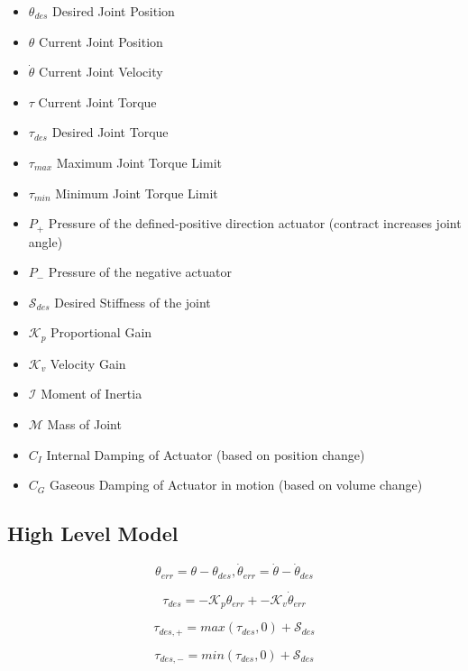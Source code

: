\documentclass[12pt, letterpaper, oneside, notitlepage, onecolumn]{article}
\newcommand{\bbss}[1]{\subsection{#1}}
\begin{document}
\begin{itemize}
\item $\theta_{des}$ Desired Joint Position
\item $\theta$ Current Joint Position
\item $\dot{\theta}$ Current Joint Velocity
\item $\tau$ Current Joint Torque
\item $\tau_{des}$ Desired Joint Torque
\item $\tau_{max}$ Maximum Joint Torque Limit
\item $\tau_{min}$ Minimum Joint Torque Limit
\item $P_{+}$ Pressure of the defined-positive direction actuator (contract
increases joint angle)
\item $P_{-}$ Pressure of the negative actuator

\item $\mathcal{S}_{des}$ Desired Stiffness of the joint
\item $\mathcal{K}_{p}$ Proportional Gain
\item $\mathcal{K}_{v}$ Velocity Gain

\item $\mathcal{I}$ Moment of Inertia
\item $\mathcal{M}$ Mass of Joint
\item $C_{I}$ Internal Damping of Actuator (based on position change)
\item $C_{G}$ Gaseous Damping of Actuator in motion (based on volume change)
\end{itemize}

\bbss{High Level Model}

\begin{equation}
\theta_{err} = \theta - \theta_{des},
\dot{\theta}_{err} = \dot{\theta} - \dot{\theta}_{des}
\end{equation}

\begin{equation}
\tau_{des} = -\mathcal{K}_{p} \theta_{err} + -\mathcal{K}_{v} \dot{\theta}_{err}
\end{equation}

\begin{equation}
\tau_{des, +} = max(\tau_{des}, 0) + \mathcal{S}_{des}
\end{equation}

\begin{equation}
\tau_{des, -} = min(\tau_{des}, 0) + \mathcal{S}_{des}
\end{equation}
\end{document}
